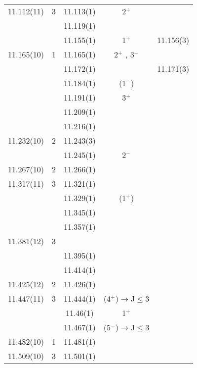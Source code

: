 \begin{center}
\begin{longtable}{cc cc c}
     11.112(11)   & 3 & 11.113(1)   &            2$^+$              &               \\
  &   & 11.119(1)   &                               &               \\
  &   & 11.155(1)   &            1$^+$              &    11.156(3)  \\
    11.165(10)    & 1 & 11.165(1)   &            2$^+$ ,  3$^-$           &               \\
  &   & 11.172(1)   &                               &    11.171(3)  \\
  &   & 11.184(1)   &            (1$^-$)            &   \\
  &   & 11.191(1)   &            3$^+$              &   \\
  &   & 11.209(1)   &                               &   \\
  &   & 11.216(1)   &                               &   \\
    11.232(10)    & 2 & 11.243(3)   &                               &   \\
  &   & 11.245(1)   &            2$^-$              &   \\
    11.267(10)    & 2 & 11.266(1)   &                               &   \\
    11.317(11)    & 3 & 11.321(1)   &                               &   \\
  &   & 11.329(1)   &           (1$^+$)             &   \\
  &   & 11.345(1)   &                               &   \\
  &   & 11.357(1)   &                               &   \\
    11.381(12)    & 3 &   &   &   \\
  &   & 11.395(1)   &                               &   \\
  &   & 11.414(1)   &                               &   \\
    11.425(12)    & 2 & 11.426(1)   &                               &   \\
    11.447(11)    & 3 & 11.444(1)   & (4$^+$)$\rightarrow$J$\leq$3  &   \\
  &   & 11.46(1)    &        1$^+$                  &   \\
  &   & 11.467(1)   & (5$^-$)$\rightarrow$J$\leq$3  &   \\
    11.482(10)    & 1 & 11.481(1)   &                               &   \\
    11.509(10)    & 3 & 11.501(1)   &                               &   \\

\end{longtable}
\end{center}
